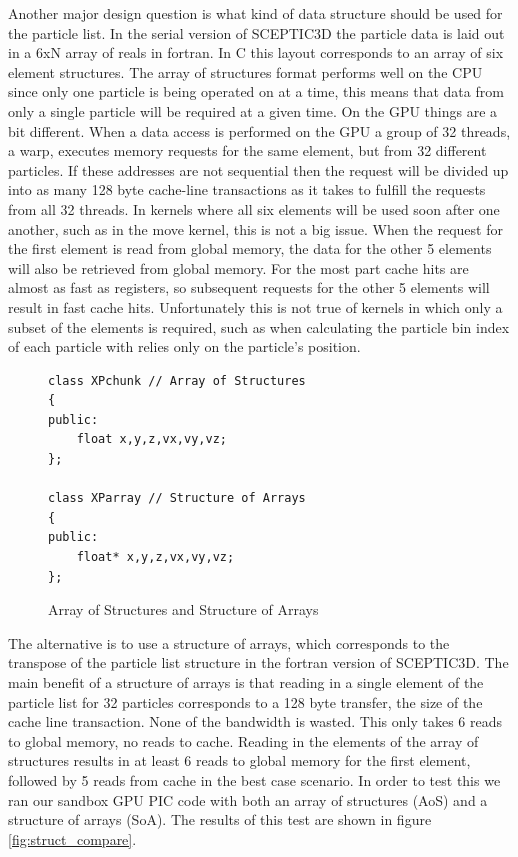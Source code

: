 Another major design question is what kind of data structure should be used for the particle list. In the serial version of SCEPTIC3D the particle data is laid out in a 6xN array of reals in fortran. In C this layout corresponds to an array of six element structures. The array of structures format performs well on the CPU since only one particle is being operated on at a time, this means that data from only a single particle will be required at a given time. On the GPU things are a bit different. When a data access is performed on the GPU a group of 32 threads, a warp, executes memory requests for the same element, but from 32 different particles. If these addresses are not sequential then the request will be divided up into as many 128 byte cache-line transactions as it takes to fulfill the requests from all 32 threads. In kernels where all six elements will be used soon after one another, such as in the move kernel, this is not a big issue. When the request for the first element is read from global memory, the data for the other 5 elements will also be retrieved from global memory. For the most part cache hits are almost as fast as registers, so subsequent requests for the other 5 elements will result in fast cache hits. Unfortunately this is not true of kernels in which only a subset of the elements is required, such as when calculating the particle bin index of each particle with relies only on the particle's position. \cite{NVIDIACorporation2011}

\begin{figure}
\begin{lstlisting}[frame=single]
class XPchunk // Array of Structures
{
public:
	float x,y,z,vx,vy,vz;
};

class XParray // Structure of Arrays
{
public:
	float* x,y,z,vx,vy,vz;
};
\end{lstlisting}
\caption{Array of Structures and Structure of Arrays}
\end{figure}   
	
	The alternative is to use a structure of arrays, which corresponds to the transpose of the particle list structure in the fortran version of SCEPTIC3D. The main benefit of a structure of arrays is that reading in a single element of the particle list for 32 particles corresponds to a 128 byte transfer, the size of the cache line transaction. None of the bandwidth is wasted. This only takes 6 reads to global memory, no reads to cache. Reading in the elements of the array of structures results in at least 6 reads to global memory for the first element, followed by 5 reads from cache in the best case scenario. In order to test this we ran our sandbox GPU PIC code with both an array of structures (AoS) and a structure of arrays (SoA). The results of this test are shown in figure \ref{fig:struct_compare}. 
	
